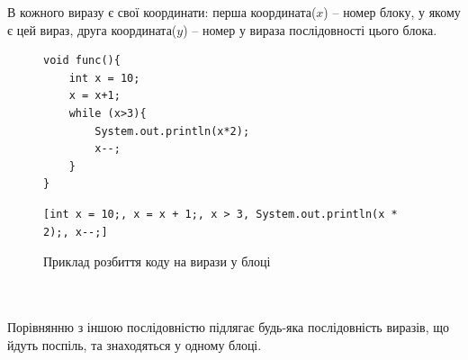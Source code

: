 \documentclass[a4paper, 14pt]{article}
\begin{document}
В кожного виразу є свої координати: перша координата($x$) -- номер блоку, у якому є цей вираз, друга координата($y$) -- номер у вираза послідовності цього блока.
\begin{figure}[h!]
\centering
\begin{minipage}{.4\textwidth}
\begin{lstlisting}[frame=none]
void func(){
	int x = 10;
	x = x+1;
	while (x>3){
		System.out.println(x*2);
		x--;
	}
}
\end{lstlisting}
\end{minipage}
\begin{minipage}{.5\textwidth}
\begin{lstlisting}[frame=none]
[int x = 10;, x = x + 1;, x > 3, System.out.println(x * 2);, x--;]
\end{lstlisting}
\end{minipage}
\caption*{Приклад розбиття коду на вирази у блоці}
\end{figure} \\ \null \\
Порівнянню з іншою послідовністю підлягає будь-яка послідовність виразів, що йдуть поспіль, та знаходяться у одному блоці. \\
\end{document}
